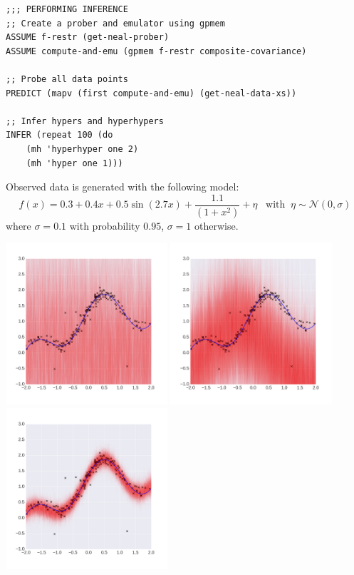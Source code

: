 \documentclass[a0,portrait]{a0poster}
\begin{document}
\begin{multicols}{3}
\begin{minipage}{\linewidth}
\begin{lstlisting}[frame=single,caption=Hierarchical  GP Smoothing,mathescape,label=alg:gphierarch]
;;; PERFORMING INFERENCE
;; Create a prober and emulator using gpmem
ASSUME f-restr (get-neal-prober)
ASSUME compute-and-emu (gpmem f-restr composite-covariance)

;; Probe all data points
PREDICT (mapv (first compute-and-emu) (get-neal-data-xs))

;; Infer hypers and hyperhypers
INFER (repeat 100 (do
    (mh 'hyperhyper one 2)
    (mh 'hyper one 1)))

\end{lstlisting}
\end{minipage}
Observed data is generated with the following model: 
\begin{equation*}
f(x) =  0.3 + 0.4 x + 0.5 \sin(2.7x) + \frac{1.1}{(1+ x^2)} + \eta \;\;\; \text{with}\;\;\eta \sim \mathcal{N}(0,\sigma)
\end{equation*} where $\sigma = 0.1$ with probability $0.95$, $\sigma = 1$ otherwise.
\begin{center}
\includegraphics[width=6cm]{neal_se_1final.png}
\includegraphics[width=6cm]{neal_se_2final.png}
\includegraphics[width=6cm]{neal_se_3final.png}
\end{center}



\end{multicols}
\end{document}
